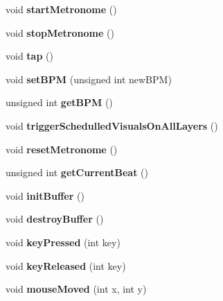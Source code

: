 \begin{DoxyCompactItemize}
void {\bfseries start\+Metronome} ()
\item 
\mbox{\label{class_engine_a15599493b7802e76e5c9d41c809780c4}} 
void {\bfseries stop\+Metronome} ()
\item 
\mbox{\label{class_engine_ab65eac2d82aa0d8111e9a4b2e6d0ecc1}} 
void {\bfseries tap} ()
\item 
\mbox{\label{class_engine_a353f4e05ddda3cc59c8f1771f71662c6}} 
void {\bfseries set\+B\+PM} (unsigned int new\+B\+PM)
\item 
\mbox{\label{class_engine_a047a41c1296190a69107b4aac41ccaed}} 
unsigned int {\bfseries get\+B\+PM} ()
\item 
\mbox{\label{class_engine_a7047f8df5a9c5607dbb61dbec043b3f0}} 
void {\bfseries trigger\+Schedulled\+Visuals\+On\+All\+Layers} ()
\item 
\mbox{\label{class_engine_aa087714d3b0cc57d7ef830307eec34d7}} 
void {\bfseries reset\+Metronome} ()
\item 
\mbox{\label{class_engine_a499ded081fc30ca383551920dfbe2da9}} 
unsigned int {\bfseries get\+Current\+Beat} ()
\item 
\mbox{\label{class_engine_a4de047df829801ba27022c4ae69d7722}} 
void {\bfseries init\+Buffer} ()
\item 
\mbox{\label{class_engine_a824d9fdae22ed6832f8c353880bdc6c4}} 
void {\bfseries destroy\+Buffer} ()
\item 
\mbox{\label{class_engine_a5f19d013ac5499d1b1a3f4ebd2169964}} 
void {\bfseries key\+Pressed} (int key)
\item 
\mbox{\label{class_engine_a2d598300be2dc442672e3f8bf3d30c5a}} 
void {\bfseries key\+Released} (int key)
\item 
\mbox{\label{class_engine_ae4b6b116aa4d6c5890fda96e83f4ae20}} 
void {\bfseries mouse\+Moved} (int x, int y)
\item 

\end{DoxyCompactItemize}
